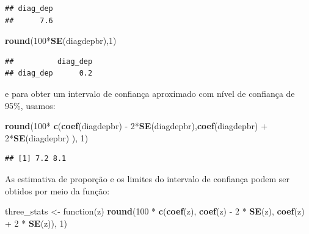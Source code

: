 \documentclass[]{book}
\newenvironment{Shaded}{\begin{snugshade}}{\end{snugshade}}
\newcommand{\KeywordTok}[1]{\textcolor[rgb]{0.13,0.29,0.53}{\textbf{{#1}}}}
\newcommand{\DecValTok}[1]{\textcolor[rgb]{0.00,0.00,0.81}{{#1}}}
\newcommand{\StringTok}[1]{\textcolor[rgb]{0.31,0.60,0.02}{{#1}}}
\newcommand{\NormalTok}[1]{{#1}}
\numberwithin{example}{chapter}
\numberwithin{remark}{chapter}
\numberwithin{definition}{chapter}
\begin{document}
\begin{verbatim}
## diag_dep 
##      7.6
\end{verbatim}

\begin{Shaded}
\begin{Highlighting}[]
\KeywordTok{round}\NormalTok{(}\DecValTok{100}\NormalTok{*}\KeywordTok{SE}\NormalTok{(diagdepbr),}\DecValTok{1}\NormalTok{)}
\end{Highlighting}
\end{Shaded}

\begin{verbatim}
##          diag_dep
## diag_dep      0.2
\end{verbatim}

e para obter um intervalo de confiança aproximado com nível de confiança
de 95\%, usamos:

\begin{Shaded}
\begin{Highlighting}[]
\KeywordTok{round}\NormalTok{(}\DecValTok{100}\NormalTok{*}\StringTok{ }\KeywordTok{c}\NormalTok{(}\KeywordTok{coef}\NormalTok{(diagdepbr) -}\StringTok{ }\DecValTok{2}\NormalTok{*}\KeywordTok{SE}\NormalTok{(diagdepbr),}\KeywordTok{coef}\NormalTok{(diagdepbr) +}\StringTok{ }\DecValTok{2}\NormalTok{*}\KeywordTok{SE}\NormalTok{(diagdepbr)  ), }\DecValTok{1}\NormalTok{)}
\end{Highlighting}
\end{Shaded}

\begin{verbatim}
## [1] 7.2 8.1
\end{verbatim}

As estimativa de proporção e os limites do intervalo de confiança podem
ser obtidos por meio da função:

\begin{Shaded}
\begin{Highlighting}[]
\NormalTok{three_stats <-}\StringTok{ }\NormalTok{function(z) }\KeywordTok{round}\NormalTok{(}\DecValTok{100} \NormalTok{*}\StringTok{ }\KeywordTok{c}\NormalTok{(}\KeywordTok{coef}\NormalTok{(z), }\KeywordTok{coef}\NormalTok{(z) -}\StringTok{ }
\StringTok{  }\DecValTok{2} \NormalTok{*}\StringTok{ }\KeywordTok{SE}\NormalTok{(z), }\KeywordTok{coef}\NormalTok{(z) +}\StringTok{ }\DecValTok{2} \NormalTok{*}\StringTok{ }\KeywordTok{SE}\NormalTok{(z)), }\DecValTok{1}\NormalTok{)}
\end{Highlighting}
\end{Shaded}
\end{document}
